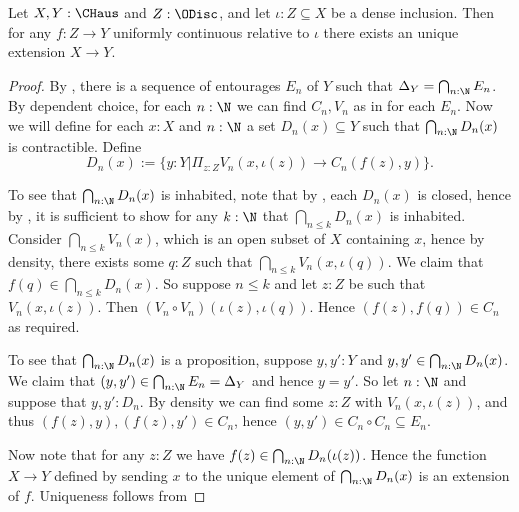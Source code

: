 \begin{theorem}\label{ExtensionCHaus}
  Let $X,Y:\CHaus$ and $Z:\ODisc$, and let $\iota:Z\subseteq X$ be a dense inclusion. Then for any $f:Z\to Y$ uniformly continuous relative to $\iota$ there exists an unique extension $X \to Y$. 
\end{theorem} 
\begin{proof}
  By , there is a sequence of entourages $E_n$ of $Y$ such that $\Delta_Y = \bigcap_{n:\N} E_n$. By dependent choice, for each $n:\N$ we can find $C_n,V_n$ as in  for each $E_n$. 
  Now we will define for each $x:X$ and $n:\N$ a set $D_n(x)\subseteq Y$ such that $\bigcap_{n:\N} D_n(x)$ is contractible. Define
  $$D_n(x):=  \{y:Y | \Pi_{z:Z} V_n(x,\iota(z)) \to C_n(f(z),y)\}. $$
  \item To see that $\bigcap_{n:\N}D_n(x)$ is inhabited, note that by , each $D_n(x)$ is closed, hence by , it is sufficient to show for any $k:\N$ that $\bigcap_{n\leq k}D_n(x)$ is inhabited. 
    Consider $\bigcap_{n\leq k}V_n(x)$, which is an open subset of $X$ containing $x$, hence by density, there exists some $q:Z$ such that $\bigcap_{n\leq k}V_n(x,\iota(q))$. We claim that $f(q)\in \bigcap_{n\leq k}D_n(x)$. So suppose $n\leq k$ and let $z:Z$ be such that $V_n(x,\iota(z))$. Then $(V_n\circ V_n)(\iota(z),\iota(q))$. Hence $(f(z),f(q)) \in C_n$ as required. 
  \item To see that $\bigcap_{n:\N} D_n(x)$ is a proposition, suppose $y,y':Y$ and $y,y' \in \bigcap_{n:\N} D_n(x)$. We claim that $(y,y') \in \bigcap_{n:\N} E_n = \Delta_Y$ and hence $y = y'$. So let $n:\N$ and suppose that $y,y':D_n$. By density we can find some $z:Z$ with $V_n(x,\iota(z))$, and thus $(f(z),y),(f(z),y') \in C_n$, hence $(y,y') \in C_n \circ C_n \subseteq E_n$. 
  \item Now note that for any $z:Z$ we have $f(z) \in \bigcap_{n:\N} D_n(\iota(z))$. Hence the function $X \to Y$ defined by sending $x$ to the unique element of $\bigcap_{n:\N}D_n(x)$ is an extension of $f$. Uniqueness follows from 

\end{proof}
%

